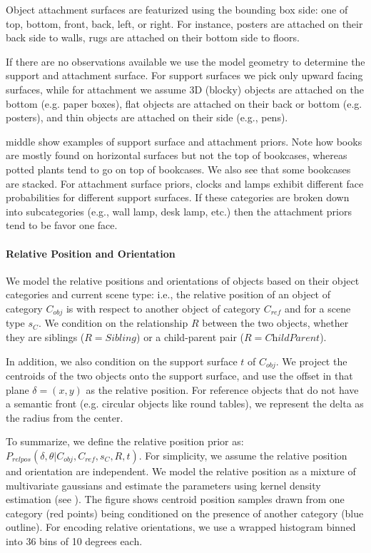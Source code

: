 \documentclass{sigchi}
\begin{document}
Object attachment surfaces are featurized using the bounding box side: one of top, bottom, front, back, left, or right.  For instance, posters are attached on their back side to walls, rugs are attached on their bottom side to floors.

If there are no observations available we use the model geometry to determine the support and attachment surface. For support surfaces we pick only upward facing surfaces, while for attachment we assume 3D (blocky) objects are attached on the bottom (e.g. paper boxes), flat objects are attached on their back or bottom (e.g. posters), and thin objects are attached on their side (e.g., pens).

 middle show examples of support surface and attachment priors.  Note how books are mostly found on horizontal surfaces but not the top of bookcases, whereas potted plants tend to go on top of bookcases.  We also see that some bookcases are stacked.  For attachment surface priors, clocks and lamps exhibit different face probabilities for different support surfaces.  If these categories are broken down into subcategories (e.g., wall lamp, desk lamp, etc.) then the attachment priors tend to be favor one face.

\paragraph{Relative Position and Orientation}
We model the relative positions and orientations of objects based on their object categories and current scene type: i.e., the relative position of an object of category $C_\textit{obj}$ is with respect to another object of category $C_\textit{ref}$ and for a scene type $s_C$.  We condition on the relationship $R$ between the two objects, whether they are siblings ($R=\textit{Sibling}$) or a child-parent pair ($R=\textit{ChildParent}$).  

In addition, we also condition on the support surface $t$ of $C_\textit{obj}$.  We project the centroids of the two objects onto the support surface, and use the offset in that plane $\delta = (x,y)$ as the relative position.  For reference objects that do not have a semantic front (e.g. circular objects like round tables), we represent the delta as the radius from the center.

To summarize, we define the relative position prior as: $P_\textit{relpos}( \delta,\theta | C_\textit{obj}, C_\textit{ref}, s_C, R, t )$.  For simplicity, we assume the relative position and orientation are independent.  We model the relative position as a mixture of multivariate gaussians and estimate the parameters using kernel density estimation (see ).  The figure shows centroid position samples drawn from one category (red points) being conditioned on the presence of another category (blue outline).  For encoding relative orientations, we use a wrapped histogram binned into 36 bins of 10 degrees each.
\end{document}
